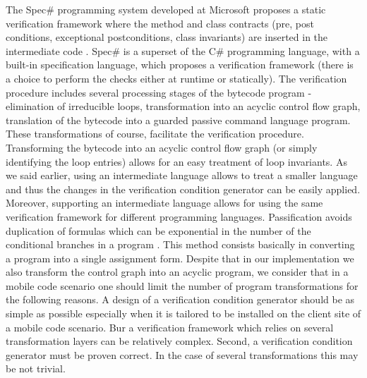  The Spec\# \cite{BLS04sp} programming system developed at Microsoft proposes a static verification framework where 
 the method and class contracts  (pre, post conditions, exceptional postconditions, class invariants) are inserted in the intermediate code . 
 Spec\# is a superset of the C\# programming language, with a built-in  specification language, 
 which proposes a verification framework (there is a choice to perform the checks either at runtime or statically). 
 The verification procedure \cite{leinoWPUP} includes several processing stages of the bytecode program -  
 elimination of irreducible loops, transformation into an acyclic control flow graph,
 translation of the bytecode into a guarded passive command language program. 
 These transformations of course, facilitate the verification procedure.
 Transforming the bytecode into an acyclic control flow graph (or simply identifying the loop entries)
 allows for an easy treatment of loop invariants. As we said earlier, using an intermediate language allows to treat a smaller
 language and thus the changes in the verification condition generator can be easily applied. 
 Moreover, supporting an intermediate language allows for using the same verification framework for different programming languages. 
 Passification avoids duplication of formulas which can be exponential in the number of the conditional branches in a program 
\cite{RL05EWP}. This method consists basically in converting a program into a single assignment form.
 Despite that  in our implementation we also
  transform  the control graph into an acyclic program, we consider that in a mobile code scenario
 one should limit the number of program transformations for the following reasons.
 A design of a verification condition generator should be as simple as possible especially when it is tailored to be installed 
on the client site of a mobile code scenario.
 Bur a verification framework which relies on several transformation layers 
 can be relatively complex.  Second,  a verification condition generator must be proven correct. 
In the case of several transformations this may be not trivial.




 


 
